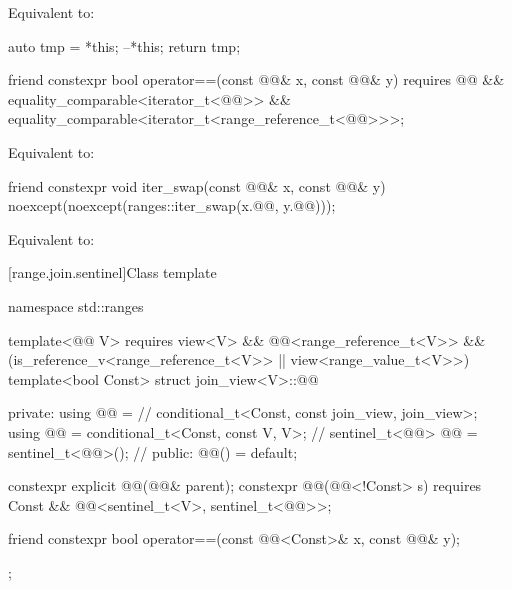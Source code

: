 \begin{itemdescr}
\pnum
\effects
Equivalent to:
\begin{codeblock}
auto tmp = *this;
--*this;
return tmp;
\end{codeblock}
\end{itemdescr}

%
\begin{itemdecl}
friend constexpr bool operator==(const @@& x, const @@& y)
  requires @@ && equality_comparable<iterator_t<@@>> &&
           equality_comparable<iterator_t<range_reference_t<@@>>>;
\end{itemdecl}

\begin{itemdescr}
\pnum
\effects
Equivalent to:
\end{itemdescr}

%
\begin{itemdecl}
friend constexpr void iter_swap(const @@& x, const @@& y)
  noexcept(noexcept(ranges::iter_swap(x.@@, y.@@)));
\end{itemdecl}

\begin{itemdescr}
\pnum
\effects
Equivalent to: 
\end{itemdescr}

[range.join.sentinel]{Class template }

%
\begin{codeblock}
namespace std::ranges {
  template<@@ V>
    requires view<V> && @@<range_reference_t<V>> &&
             (is_reference_v<range_reference_t<V>> ||
              view<range_value_t<V>>)
  template<bool Const>
  struct join_view<V>::@@ {
  private:
    using @@ =                                      // \expos
      conditional_t<Const, const join_view, join_view>;
    using @@   = conditional_t<Const, const V, V>;    // \expos
    sentinel_t<@@> @@ = sentinel_t<@@>();         // \expos
  public:
    @@() = default;

    constexpr explicit @@(@@& parent);
    constexpr @@(@@<!Const> s)
      requires Const && @@<sentinel_t<V>, sentinel_t<@@>>;

    friend constexpr bool operator==(const @@<Const>& x, const @@& y);
  };
}
\end{codeblock}

